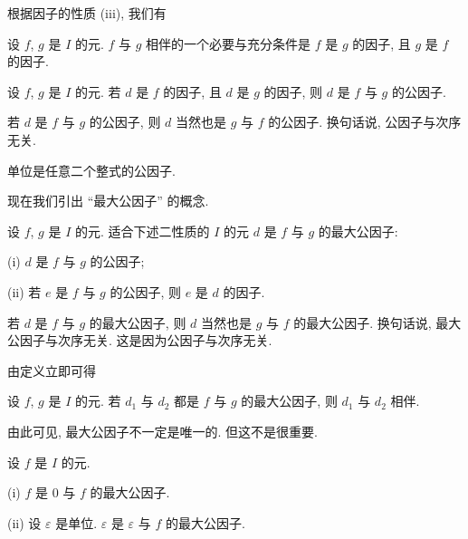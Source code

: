 根据因子的性质 (iii), 我们有
\begin{proposition}
    设 $f$, $g$ 是 $I$ 的元. $f$ 与 $g$ 相伴的一个必要与充分条件是 $f$ 是 $g$ 的因子, 且 $g$ 是 $f$ 的因子.
\end{proposition}

\begin{definition}
    设 $f$, $g$ 是 $I$ 的元. 若 $d$ 是 $f$ 的因子, 且 $d$ 是 $g$ 的因子, 则 $d$ 是 $f$ 与 $g$ 的公因子.
\end{definition}

\begin{remark}
    若 $d$ 是 $f$ 与 $g$ 的公因子, 则 $d$ 当然也是 $g$ 与 $f$ 的公因子. 换句话说, 公因子与次序无关.
\end{remark}

\begin{proposition}
    单位是任意二个整式的公因子.
\end{proposition}

现在我们引出 ``最大公因子'' 的概念.

\begin{definition}
    设 $f$, $g$ 是 $I$ 的元. 适合下述二性质的 $I$ 的元 $d$ 是 $f$ 与 $g$ 的最大公因子:

    (i) $d$ 是 $f$ 与 $g$ 的公因子;

    (ii) 若 $e$ 是 $f$ 与 $g$ 的公因子, 则 $e$ 是 $d$ 的因子.
\end{definition}

\begin{remark}
    若 $d$ 是 $f$ 与 $g$ 的最大公因子, 则 $d$ 当然也是 $g$ 与 $f$ 的最大公因子. 换句话说, 最大公因子与次序无关. 这是因为公因子与次序无关.
\end{remark}

由定义立即可得
\begin{proposition}
    设 $f$, $g$ 是 $I$ 的元. 若 $d_1$ 与 $d_2$ 都是 $f$ 与 $g$ 的最大公因子, 则 $d_1$ 与 $d_2$ 相伴.
\end{proposition}

\begin{remark}
    由此可见, 最大公因子不一定是唯一的. 但这不是很重要.
\end{remark}

\begin{proposition}
    设 $f$ 是 $I$ 的元.

    (i) $f$ 是 $0$ 与 $f$ 的最大公因子.

    (ii) 设 $\varepsilon$ 是单位. $\varepsilon$ 是 $\varepsilon$ 与 $f$ 的最大公因子.
\end{proposition}

